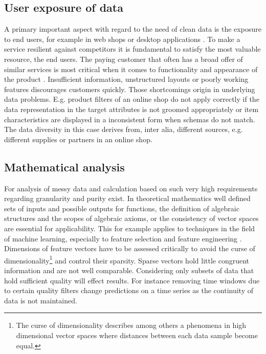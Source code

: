 \subsection{User exposure of data}

A primary important aspect with regard to the need of clean data is the exposure to end users, for example in web shops or desktop applications \cite{kim_niehm_2009}. To make a service resilient against competitors it is fundamental to satisfy the most valuable resource, the end users. The paying customer that often has a broad offer of similar services is most critical when it comes to functionality and appearance of the product \cite{huitfeldt_middleton_2001}. Insufficient information, unstructured layouts or poorly working features discourages customers quickly. Those shortcomings origin in underlying data problems. E.g. product filters of an online shop do not apply correctly if the data representation in the target attributes is not groomed appropriately or item characteristics are displayed in a inconsistent form when schemas do not match. The data diversity in this case derives from, inter alia, different sources, e.g. different supplies or partners in an online shop.

\subsection{Mathematical analysis} 

For analysis of messy data and calculation based on such 
very high requirements regarding granularity and purity exist. In theoretical mathematics well defined sets of inputs and possible outputs for functions, the definition of algebraic structures and the scopes of algebraic axioms, or the consistency of vector spaces are essential for applicability. This for example applies to techniques in the field of machine learning, especially to feature selection and feature engineering \cite{mitchell_1999}. Dimensions of feature vectors have to be assessed critically to avoid the curse of dimensionality\footnote{The curse of dimensionality describes among others a phenomena in high dimensional vector spaces where distances between each data sample become equal.} and control their sparsity. Sparse vectors hold little congruent information and are not well comparable. Considering only subsets of data that hold sufficient quality will effect results. For instance removing time windows due to certain quality filters change predictions on a time series as the continuity of data is not maintained.

